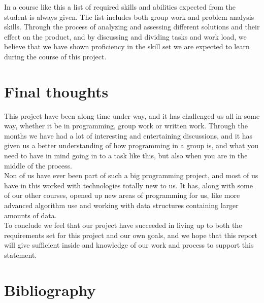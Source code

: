 \documentclass[a4paper,10pt,titlepage]{article}
\begin{document}
In a course like this a list of required skills and abilities expected from the student is always given. The list includes both group work and problem analysis skills. Through the process of analyzing and assessing different solutions and their effect on the product, and by discussing and dividing tasks and work load, we believe that we have shown proficiency in the skill set we are expected to learn during the course of this project.

	 
	\newpage
	
	\section{Final thoughts}
	This project have been along time under way, and it has challenged us all in some way, whether it be in programming, group work or written work. Through the months we have had a lot of interesting and entertaining discussions, and it has given us a better understanding of how programming in a group is, and what you need to have in mind going in to a task like this, but also when you are in the middle of the process.\\

Non of us have ever been part of such a big programming project, and most of us have in this worked with technologies totally new to us. It has, along with some of our other courses, opened up new areas of programming for us, like more advanced algorithm use and working with data structures containing larger amounts of data.\\

To conclude we feel that our project have succeeded in living up to both the requirements set for this project and our own goals, and we hope that this report will give sufficient inside and knowledge of our work and process to support this statement.\\
	
	\newpage	
	
	\section{Bibliography}
	
\end{document}
